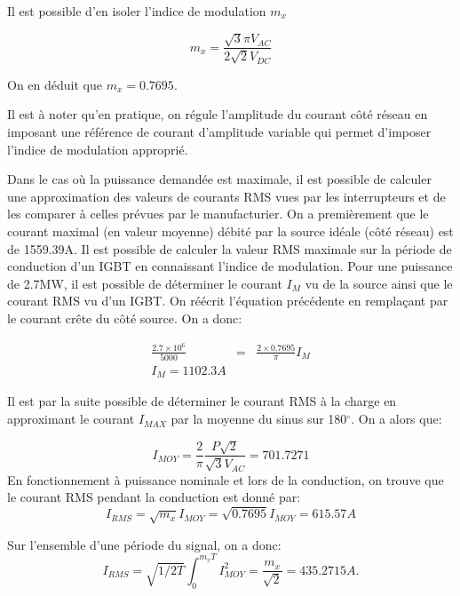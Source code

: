 Il est possible d'en isoler l'indice de modulation $m_x$

\begin{equation}
m_x = \frac{\sqrt{3}\pi V_{AC}}{2\sqrt{2}V_{DC}}
\end{equation}

On en déduit que $m_x = 0.7695$. 

Il est à noter qu'en pratique, on régule l'amplitude du courant côté réseau en imposant une référence de courant d'amplitude variable qui permet d'imposer l'indice de modulation approprié.

Dans le cas où la puissance demandée est maximale, il est possible de calculer une approximation des valeurs de courants RMS vues par les interrupteurs et de les comparer à celles prévues par le manufacturier. On a premièrement que le courant maximal (en valeur moyenne) débité par la source idéale (côté réseau) est de 1559.39A. Il est possible de calculer la valeur RMS maximale sur la période de conduction d'un IGBT en connaissant l'indice de modulation.  Pour une puissance de 2.7MW, il est possible de déterminer le courant $I_M$ vu de la source ainsi que le courant RMS vu d'un IGBT. On réécrit l'équation précédente en remplaçant par le courant crête du côté source. On a donc:

\begin{eqnarray}
\frac{2.7\times 10^6}{5000} &=& \frac{2 \times 0.7695}{\pi} I_M\\
I_M = 1102.3A
\end{eqnarray}

Il est par la suite possible de déterminer le courant RMS à la charge en approximant le courant $I_{MAX}$ par la moyenne du sinus sur 180$^\circ$. On a alors que:

\begin{equation}
I_{MOY} = \frac{2}{\pi} \frac{P\sqrt{2}}{\sqrt{3}V_{AC}} = 701.7271
\end{equation}
En fonctionnement à puissance nominale et lors de la conduction, on trouve que le courant RMS pendant la conduction est donné par:
\begin{equation}
I_{RMS} =  \sqrt{m_x}I_{MOY} = \sqrt{0.7695}I_{MOY} = 615.57A
\end{equation}

Sur l'ensemble d'une période du signal, on a donc:
\begin{equation}
I_{RMS} =  \sqrt{1/2T}\int_0^{m_xT} I_{MOY}^2 = \frac{m_x}{\sqrt{2}}= 435.2715A.
\end{equation}

